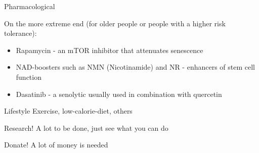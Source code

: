 \begin{frame}[c]{Pharmacological}
    \pause

    On the more extreme end (for older people or people with a higher risk tolerance):

    \begin{itemize}[<+(1)->]
        \item Rapamycin - an mTOR inhibitor that attenuates senescence
        \item NAD-boosters such as NMN (Nicotinamide) and NR - enhancers of stem cell function

        \item Dasatinib - a senolytic usually used in combination with quercetin
    \end{itemize}

\end{frame}


\begin{frame}[c]{Lifestyle}
    Exercise, low-calorie-diet, others
\end{frame}


\begin{frame}[c]{Research!}
    A lot to be done, just see what you can do
\end{frame}


\begin{frame}[c]{Donate!}
    A lot of money is needed
\end{frame}
